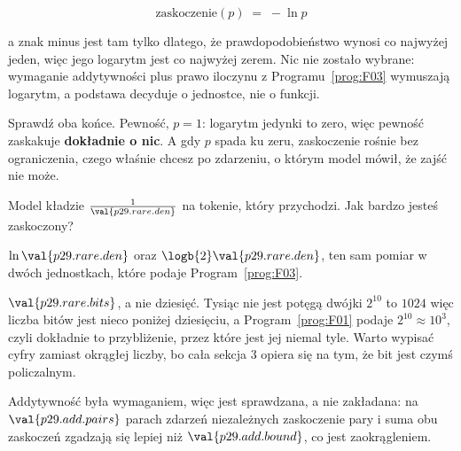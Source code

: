 \begin{fr}

\[ \text{zaskoczenie}(p) \;=\; -\ln p \]

a znak minus jest tam tylko dlatego, że prawdopodobieństwo wynosi co najwyżej
jeden, więc jego logarytm jest co najwyżej zerem. Nic nie zostało wybrane:
wymaganie addytywności plus prawo iloczynu z Programu~\ref{prog:F03} wymuszają
logarytm, a podstawa decyduje o jednostce, nie o funkcji.

Sprawdź oba końce. Pewność, $p = 1$: logarytm jedynki to zero, więc pewność
zaskakuje \textbf{dokładnie o nic}. A gdy $p$ spada ku zeru, zaskoczenie rośnie
bez ograniczenia, czego właśnie chcesz po zdarzeniu, o którym model mówił, że
zajść nie może.

Model kładzie $\frac{1}{\val{p29.rare.den}}$ na tokenie, który przychodzi. Jak
bardzo jesteś zaskoczony?
\dotline
\nextframe
\end{fr}

\begin{fr}

$\ln \val{p29.rare.den}$ oraz $\logb{2} \val{p29.rare.den}$, ten sam pomiar w
dwóch jednostkach, które podaje Program~\ref{prog:F03}.

\begin{note}
$\val{p29.rare.bits}$, a nie dziesięć. Tysiąc nie jest potęgą dwójki \dash{}
$2^{10}$ to $1024$ \dash{} więc liczba bitów jest nieco poniżej dziesięciu, a
Program~\ref{prog:F01} podaje $2^{10} \approx 10^{3}$, czyli dokładnie to
przybliżenie, przez które jest jej niemal tyle. Warto wypisać cyfry zamiast
okrągłej liczby, bo cała sekcja 3 opiera się na tym, że bit jest czymś
policzalnym.
\end{note}

Addytywność była wymaganiem, więc jest sprawdzana, a nie zakładana: na
$\val{p29.add.pairs}$ parach zdarzeń niezależnych zaskoczenie pary i suma obu
zaskoczeń zgadzają się lepiej niż $\val{p29.add.bound}$, co jest
zaokrągleniem.

\end{fr}

